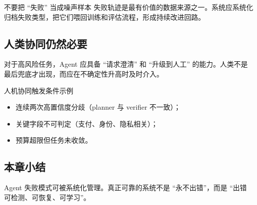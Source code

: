 \begin{warningbox}{不要把 ``失败'' 当成噪声样本}
失败轨迹是最有价值的数据来源之一。系统应系统化归档失败类型，把它们喂回训练和评估流程，形成持续改进回路。
\end{warningbox}

\subsection{人类协同仍然必要}
对于高风险任务，Agent 应具备 ``请求澄清'' 和 ``升级到人工'' 的能力。人类不是最后兜底才出现，而应在不确定性升高时及时介入。

\begin{knowledgebox}{人机协同触发条件示例}
\begin{itemize}
    \item 连续两次高置信度分歧（planner 与 verifier 不一致）；
    \item 关键字段不可判定（支付、身份、隐私相关）；
    \item 预算超限但任务未收敛。
\end{itemize}
\end{knowledgebox}

\subsection{本章小结}
Agent 失败模式可被系统化管理。真正可靠的系统不是 ``永不出错''，而是 ``出错可检测、可恢复、可学习''。

